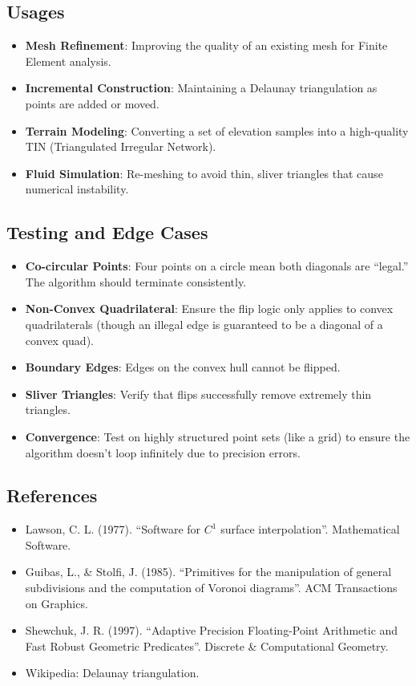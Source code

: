 \subsection{Usages}

\begin{itemize}
\item \textbf{Mesh Refinement}: Improving the quality of an existing mesh for Finite Element analysis.
\item \textbf{Incremental Construction}: Maintaining a Delaunay triangulation as points are added or moved.
\item \textbf{Terrain Modeling}: Converting a set of elevation samples into a high-quality TIN (Triangulated Irregular Network).
\item \textbf{Fluid Simulation}: Re-meshing to avoid thin, sliver triangles that cause numerical instability.
\end{itemize}

\subsection{Testing and Edge Cases}

\begin{itemize}
\item \textbf{Co-circular Points}: Four points on a circle mean both diagonals are ``legal.'' The algorithm should terminate consistently.
\item \textbf{Non-Convex Quadrilateral}: Ensure the flip logic only applies to convex quadrilaterals (though an illegal edge is guaranteed to be a diagonal of a convex quad).
\item \textbf{Boundary Edges}: Edges on the convex hull cannot be flipped.
\item \textbf{Sliver Triangles}: Verify that flips successfully remove extremely thin triangles.
\item \textbf{Convergence}: Test on highly structured point sets (like a grid) to ensure the algorithm doesn't loop infinitely due to precision errors.
\end{itemize}

\subsection{References}

\begin{itemize}
\item Lawson, C. L. (1977). ``Software for $C^1$ surface interpolation''. Mathematical Software.
\item Guibas, L., \& Stolfi, J. (1985). ``Primitives for the manipulation of general subdivisions and the computation of Voronoi diagrams''. ACM Transactions on Graphics.
\item Shewchuk, J. R. (1997). ``Adaptive Precision Floating-Point Arithmetic and Fast Robust Geometric Predicates''. Discrete \& Computational Geometry.
\item Wikipedia: Delaunay triangulation.
\end{itemize}


